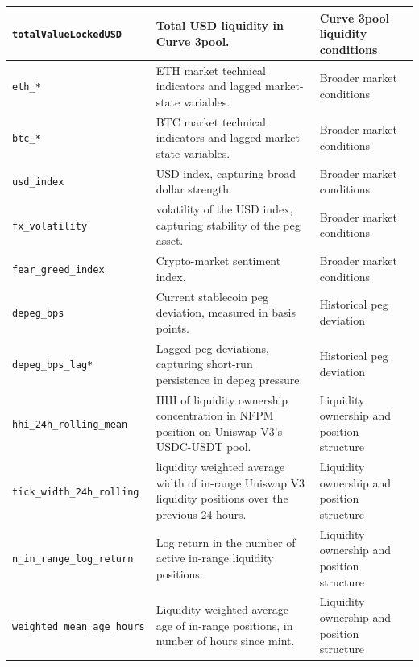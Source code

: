\documentclass[a4paper,fleqn]{cas-sc}
\begin{document}
\begin{longtable}{p{} p{} p{}}
\texttt{totalValueLockedUSD} 
& Total USD liquidity in Curve 3pool. 
& Curve 3pool liquidity conditions \\

\midrule

\texttt{eth\_*} 
& ETH market technical indicators and lagged market-state variables. 
& Broader market conditions \\

\texttt{btc\_*} 
& BTC market technical indicators and lagged market-state variables. 
& Broader market conditions \\

\texttt{usd\_index} 
& USD index, capturing broad dollar strength. 
& Broader market conditions \\

\texttt{fx\_volatility} 
& volatility of the USD index, capturing stability of the peg asset. 
& Broader market conditions \\

\texttt{fear\_greed\_index} 
& Crypto-market sentiment index. 
& Broader market conditions \\

\midrule

\texttt{depeg\_bps} 
& Current stablecoin peg deviation, measured in basis points. 
& Historical peg deviation \\

\texttt{depeg\_bps\_lag*} 
& Lagged peg deviations, capturing short-run persistence in depeg pressure. 
& Historical peg deviation \\

\midrule

\texttt{hhi\_24h\_rolling\_mean} 
& HHI of liquidity ownership concentration in NFPM position on Uniswap V3's USDC-USDT pool. 
& Liquidity ownership and position structure \\

\texttt{tick\_width\_24h\_rolling} 
& liquidity weighted average width of in-range Uniswap V3 liquidity positions over the previous 24 hours. 
& Liquidity ownership and position structure \\

\texttt{n\_in\_range\_log\_return} 
& Log return in the number of active in-range liquidity positions. 
& Liquidity ownership and position structure \\

\texttt{weighted\_mean\_age\_hours} 
& Liquidity weighted average age of in-range positions, in number of hours since mint.
& Liquidity ownership and position structure \\


\end{longtable}
\end{document}

